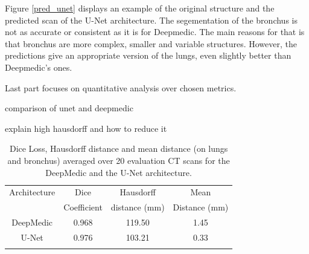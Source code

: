 Figure \ref{pred_unet} displays an example of the original structure and the predicted scan of the U-Net architecture. The segementation of the bronchus is not as accurate or consistent as it is for Deepmedic. The main reasons for that is that bronchus are more complex, smaller and variable structures. However, the predictions give an appropriate version of the lungs, even slightly better than Deepmedic's ones.\newline\newline

Last part focuses on quantitative analysis over chosen metrics.




comparison of unet and deepmedic

explain high hausdorff and how to reduce it


\begin{table}[h!]
	\caption{Dice Loss, Hausdorff distance and mean distance (on lungs and bronchus) averaged over 20 evaluation CT scans for the DeepMedic and the U-Net architecture.}
	\label{table_result}
	\centering
	\setlength{\tabcolsep}{10pt}
	\renewcommand{\arraystretch}{1.5}
	\begin{tabular}{c c c c}
		\hline 
		Architecture & Dice & Hausdorff & Mean \\
		& Coefficient & distance (mm) & Distance (mm) \\ 
		\hline 
		DeepMedic & 0.968 & 119.50 & 1.45 \\ 
		U-Net & 0.976 & 103.21 & 0.33 \\ 
		\hline
		\newline 
	\end{tabular}

\end{table}

